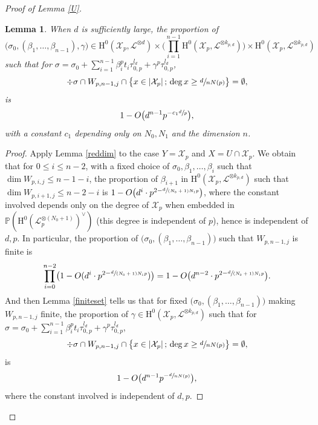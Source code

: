 \documentclass[JEP,XML,SOM,Unicode,published]{cedram}
\newcommand{\sep}{\,;\,}
\theoremstyle{plain}
\newtheorem{lem}[thm]{Lemma}
\theoremstyle{definition}
\newcommand{\ho}{\mathrm{H}}
\newcommand{\X}{\mathcal{X}}
\newcommand{\li}{\mathcal{L}}
\newcommand{\pr}{\mathbb{P}}
\begin{document}
\begin{proof}[Proof of Lemma \ref{U}]
\begin{lem}\label{5.8}
When $d$ is sufficiently large, the proportion of
\[
\big(\sigma_0, (\beta_1,\dots, \beta_{n-1}), \gamma\big) \in \ho^0(\X_p,\mathcal{L}^{\otimes d})\times \biggl(\prod_{i=1}^{n-1} \ho^0(\X_p,\mathcal{L}^{\otimes k_{p,d}}) \biggr) \times \ho^0(\X_p, \mathcal{L}^{\otimes k_{p,d}})
\]
such that for $\sigma=\sigma_{0}+\sum_{i=1}^{n-1} \beta_i^pt_i\tau_{0,p}^{l_d}+\gamma^p\tau_{0,p}^{l_d}$,
\[
\div \sigma\cap W_{p,n-1,j}\cap \bigl\{ x\in |\X_p|\sep \deg x\geq\sfrac{d}{nN(p)} \bigr\}=\emptyset,
\]
is
\[
1-O\bigl(d^{n-1}p^{-c_1\sfrac{d}{p}} \bigr),
\]
with a constant $c_1$ depending only on $N_0,N_1$ and the dimension $n$.
\end{lem}
\begin{proof}[Proof]
Apply Lemma \ref{reddim} to the case $Y=\X_p$ and $X=U\cap \X_p$. We obtain that for $0\leq i\leq n-2$, with a fixed choice of $\sigma_0,\beta_1,\dots, \beta_i$ such that $\dim W_{p,i,j}\leq n-1-i$, the proportion of $\beta_{i+1}$ in $\ho^0(\X_p,\mathcal{L}^{\otimes k_{p,d}})$ such that $\dim W_{p,i+1,j} \leq n-2-i$ is $1-O\big(d^i\cdot p^{2-\sfrac{d}{(N_0+1)N_1p}}\big)$, where the constant involved depends only on the degree of $\X_p$ when embedded in $\pr(\ho^0(\li_p^{\otimes(N_0+1)})^{\vee})$ (this degree is independent of $p$), hence is independent of $d,p$.
In particular, the proportion of $\big(\sigma_0,(\beta_1,\dots, \beta_{n-1})\big)$ such that $W_{p,n-1,j}$ is finite is
\[
\prod_{i=0}^{n-2}\bigl(1-O(d^i\cdot p^{2-\sfrac{d}{(N_0+1)N_1p}}) \bigr)=1-O\bigl(d^{n-2}\cdot p^{2-\sfrac{d}{(N_0+1)N_1p}}\bigr).
\]
And then Lemma \ref{finiteset} tells us that for fixed $\big(\sigma_0,(\beta_1,\dots, \beta_{n-1})\big)$ making $W_{p,n-1,j}$ finite, the proportion of $\gamma\in \ho^0(\X_p,\mathcal{L}^{\otimes k_{p,d}})$ such that for $\sigma=\sigma_{0}+\sum_{i=1}^{n-1} \beta_i^pt_i\tau_{0,p}^{l_d}+\gamma^p\tau_{0,p}^{l_d}$,
\[
\div \sigma\cap W_{p,n-1,j}\cap \bigl\{ x\in |\X_p|\sep \deg x\geq\sfrac{d}{nN(p)} \bigr\}=\emptyset,
\]
is
\[
1-O\bigl(d^{n-1}p^{-\sfrac{d}{nN(p)}}\bigr),
\]
where the constant involved is independent of $d,p$.


\end{proof}
\end{proof}
\end{document}
